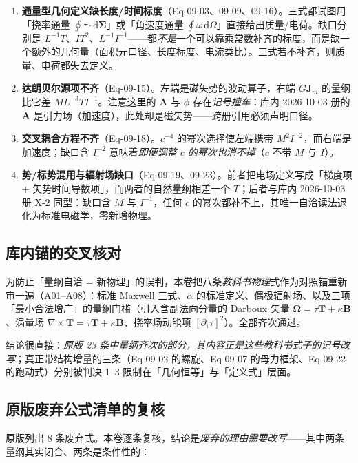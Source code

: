 \documentclass[UTF8,fontset=fandol,11pt]{ctexart}
\newcommand{\dd}{\mathrm{d}}
\newcommand{\bx}{\boldsymbol}
\begin{document}
\begin{enumerate}
  \item \textbf{通量型几何定义缺长度/时间标度}（Eq-09-03、09-09、09-16）。三式都试图用「挠率通量 $\oint\tau\cdot\dd\bx\Sigma$」或「角速度通量 $\oint\omega\,\dd\Omega$」直接给出质量/电荷。缺口分别是 $L^{-1}T$、$IT^2$、$L^{-1}I^{-1}$——都\emph{不是}一个可以靠乘常数补齐的标度，而是缺一个额外的几何量（面积元口径、长度标度、电流类比）。三式若不补齐，则质量、电荷都失去定义。
  \item \textbf{达朗贝尔源项不齐}（Eq-09-15）。左端是磁矢势的波动算子，右端 $G\bx J_m$ 的量纲比它差 $M L^{-3}T I^{-1}$。注意这里的 $\bx A$ 与 $\phi$ 存在\emph{记号撞车}：库内 2026-10-03 册的 $\bx A$ 是引力场（加速度），此处却是磁矢势——跨册引用必须声明口径。
  \item \textbf{交叉耦合方程不齐}（Eq-09-18）。$c^{-4}$ 的幂次选择使左端携带 $M^2I^{-2}$，而右端是加速度；缺口含 $I^{-2}$ 意味着\emph{即便调整 $c$ 的幂次也消不掉}（$c$ 不带 $M$ 与 $I$）。
  \item \textbf{势/标势混用与辐射场缺口}（Eq-09-19、09-23）。前者把电场定义写成「梯度项 + 矢势时间导数项」，而两者的自然量纲相差一个 $T$；后者与库内 2026-10-03 册 X-2 同型：缺口含 $M$ 与 $I^{-1}$，任何 $c$ 的幂次都补不上，其唯一自洽读法退化为标准电磁学，零新增物理。
\end{enumerate}

\subsection{库内锚的交叉核对}
为防止「量纲自洽 = 新物理」的误判，本卷把八条\emph{教科书物理}式作为对照锚重新审一遍（A01--A08）：标准 Maxwell 三式、$\alpha$ 的标准定义、偶极辐射场、以及三项「最小合法增广」的量纲门槛（引入含副法向分量的 Darboux 矢量 $\bx\Omega=\tau\bx T+\kappa\bx B$、涡量场 $\nabla\times\bx T=\tau\bx T+\kappa\bx B$、挠率场动能项 $[\partial_\tau\tau]^2$）。全部齐次通过。

结论很直接：\emph{原版 23 条中量纲齐次的部分，其内容正是这些教科书式子的记号改写}；真正带结构增量的三条（Eq-09-02 的螺旋、Eq-09-07 的母力框架、Eq-09-22 的跑动式）分别被判决 1--3 限制在「几何恒等」与「定义式」层面。

\subsection{原版废弃公式清单的复核}
原版列出 8 条废弃式。本卷逐条复核，结论是\emph{废弃的理由需要改写}——其中两条量纲其实闭合、两条是条件性的：
\end{document}
